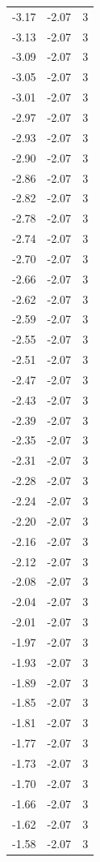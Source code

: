 \begin{longtable}{lrr}
  -3.17 & -2.07 & 3 \\
  -3.13 & -2.07 & 3 \\
  -3.09 & -2.07 & 3 \\
  -3.05 & -2.07 & 3 \\
  -3.01 & -2.07 & 3 \\
  -2.97 & -2.07 & 3 \\
  -2.93 & -2.07 & 3 \\
  -2.90 & -2.07 & 3 \\
  -2.86 & -2.07 & 3 \\
  -2.82 & -2.07 & 3 \\
  -2.78 & -2.07 & 3 \\
  -2.74 & -2.07 & 3 \\
  -2.70 & -2.07 & 3 \\
  -2.66 & -2.07 & 3 \\
  -2.62 & -2.07 & 3 \\
  -2.59 & -2.07 & 3 \\
  -2.55 & -2.07 & 3 \\
  -2.51 & -2.07 & 3 \\
  -2.47 & -2.07 & 3 \\
  -2.43 & -2.07 & 3 \\
  -2.39 & -2.07 & 3 \\
  -2.35 & -2.07 & 3 \\
  -2.31 & -2.07 & 3 \\
  -2.28 & -2.07 & 3 \\
  -2.24 & -2.07 & 3 \\
  -2.20 & -2.07 & 3 \\
  -2.16 & -2.07 & 3 \\
  -2.12 & -2.07 & 3 \\
  -2.08 & -2.07 & 3 \\
  -2.04 & -2.07 & 3 \\
  -2.01 & -2.07 & 3 \\
  -1.97 & -2.07 & 3 \\
  -1.93 & -2.07 & 3 \\
  -1.89 & -2.07 & 3 \\
  -1.85 & -2.07 & 3 \\
  -1.81 & -2.07 & 3 \\
  -1.77 & -2.07 & 3 \\
  -1.73 & -2.07 & 3 \\
  -1.70 & -2.07 & 3 \\
  -1.66 & -2.07 & 3 \\
  -1.62 & -2.07 & 3 \\
  -1.58 & -2.07 & 3 \\

\end{longtable}

